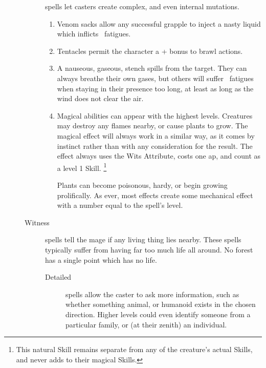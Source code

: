\begin{multicols}{2}
\begin{description}
\begin{description}
        spells let casters create complex, and even internal mutations.
        \begin{enumerate}
          \item
            \setcounter{track}{\value{enumi}}%
            \addtocounter{track}{\value{track}}%
            Venom sacks allow any successful grapple to inject a nasty liquid which inflicts ~\glspl{fatigue}.
          \item
            Tentacles permit the character a + bonus to brawl actions.
          \item
            A nauseous, gaseous, stench spills from the target.
            They can always breathe their own gases, but others will suffer ~\glspl{fatigue} when staying in their presence too long, at least as long as the wind does not clear the air.
          \item
            Magical abilities can appear with the highest levels.
            Creatures may destroy any flames nearby, or cause plants to grow.
            The magical effect will always work in a similar way, as it comes by instinct rather than with any consideration for the result.
            The effect always uses the Wits Attribute, costs one \gls{ap}, and count as a level 1 Skill.%
            \footnote{This natural Skill remains separate from any of the creature's actual Skills, and never adds to their magical Skills.}
      \item[Plants]
        can become poisonous, hardy, or begin growing prolifically.
        As ever, most effects create some mechanical effect with a number equal to the spell's level.
        \end{enumerate}
  \item[Witness]
    spells tell the mage if any living thing lies nearby.
    These spells typically suffer from having far too much life all around.
    No forest has a single point which has no life.
    \begin{description}
      \item[Detailed]
        spells allow the caster to ask more information, such as whether something animal, or humanoid exists in the chosen direction.
        Higher levels could even identify someone from a particular family, or (at their zenith) an individual.
    \end{description}
    \end{description}
\end{description}


\end{multicols}
